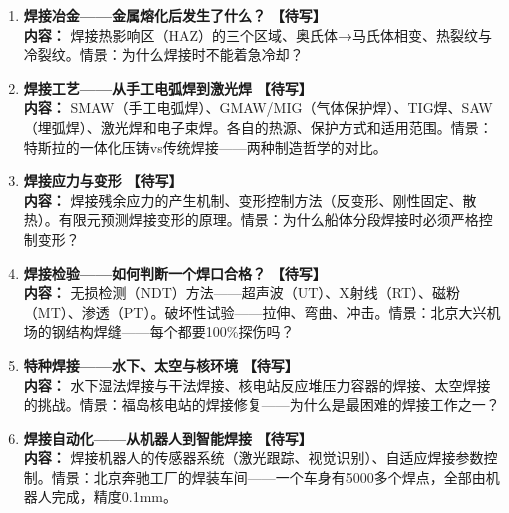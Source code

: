 \documentclass[a4paper,11pt]{ctexart}
\newcommand{\draft}{\textcolor{orange!80!black}{\textbf{【待写】}}}
\begin{document}
\begin{enumerate}
\item[\textbf{第1课}] \textbf{焊接冶金——金属熔化后发生了什么？} \draft \\
\textbf{内容：} 焊接热影响区（HAZ）的三个区域、奥氏体→马氏体相变、热裂纹与冷裂纹。情景：为什么焊接时不能着急冷却？
\item[\textbf{第2课}] \textbf{焊接工艺——从手工电弧焊到激光焊} \draft \\
\textbf{内容：} SMAW（手工电弧焊）、GMAW/MIG（气体保护焊）、TIG焊、SAW（埋弧焊）、激光焊和电子束焊。各自的热源、保护方式和适用范围。情景：特斯拉的一体化压铸vs传统焊接——两种制造哲学的对比。
\item[\textbf{第3课}] \textbf{焊接应力与变形} \draft \\
\textbf{内容：} 焊接残余应力的产生机制、变形控制方法（反变形、刚性固定、散热）。有限元预测焊接变形的原理。情景：为什么船体分段焊接时必须严格控制变形？
\item[\textbf{第4课}] \textbf{焊接检验——如何判断一个焊口合格？} \draft \\
\textbf{内容：} 无损检测（NDT）方法——超声波（UT）、X射线（RT）、磁粉（MT）、渗透（PT）。破坏性试验——拉伸、弯曲、冲击。情景：北京大兴机场的钢结构焊缝——每个都要100\%探伤吗？
\item[\textbf{第5课}] \textbf{特种焊接——水下、太空与核环境} \draft \\
\textbf{内容：} 水下湿法焊接与干法焊接、核电站反应堆压力容器的焊接、太空焊接的挑战。情景：福岛核电站的焊接修复——为什么是最困难的焊接工作之一？
\item[\textbf{第6课}] \textbf{焊接自动化——从机器人到智能焊接} \draft \\
\textbf{内容：} 焊接机器人的传感器系统（激光跟踪、视觉识别）、自适应焊接参数控制。情景：北京奔驰工厂的焊装车间——一个车身有5000多个焊点，全部由机器人完成，精度0.1mm。
\end{enumerate}
\end{document}
